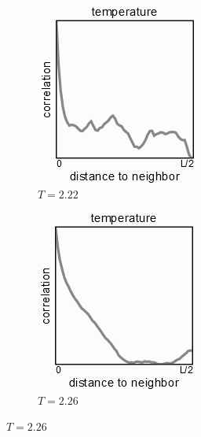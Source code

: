 \documentclass[]{article}
\begin{document}
\begin{figure}[H]
\begin{subfigure}[t]{0.24\textwidth}
	\end{subfigure}
	\begin{subfigure}[t]{0.24\textwidth}
		\caption{$T=2.22$}
		\includegraphics[width=\textwidth]{ising-correlation-22}
	\end{subfigure}
	\begin{subfigure}[t]{0.24\textwidth}
		\caption{$T=2.26$}
		\includegraphics[width=\textwidth]{ising-correlation-26}
	\end{subfigure}
\end{figure}
\end{document}
